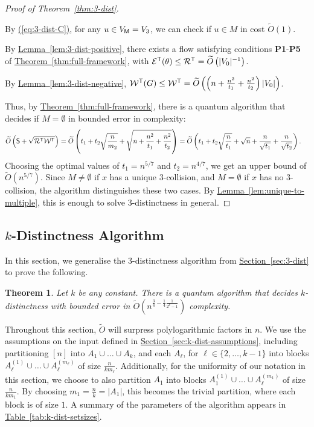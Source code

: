 \documentclass{article}
\newtheorem{theorem}{Theorem}\newtheorem{lemma}[theorem]{Lemma}\newtheorem{proposition}[theorem]{Proposition}\newtheorem{corollary}[theorem]{Corollary}\newtheorem{definition}[theorem]{Definition}\newtheorem{claim}[theorem]{Claim}\newtheorem{remark}[theorem]{Remark}\newenvironment{cfigure}[1][htbp]{\begin{figure}[#1]\centering}{\end{figure}}
\newcommand{\eq}[1]{\hyperref[eq:#1]{(\ref*{eq:#1})}}
\renewcommand{\sec}[1]{\hyperref[sec:#1]{Section~\ref*{sec:#1}}}
\newcommand{\thm}[1]{\hyperref[thm:#1]{Theorem~\ref*{thm:#1}}}
\newcommand{\lem}[1]{\hyperref[lem:#1]{Lemma~\ref*{lem:#1}}}
\newcommand{\tabl}[1]{\hyperref[tab:#1]{Table~\ref*{tab:#1}}}
\renewcommand{\>}{\rangle}
\newcommand{\<}{\langle}
\renewcommand{\(}{\left(}
\renewcommand{\)}{\right)}
\def\abs#1{\left| #1 \right|}
\begin{document}
\begin{proof}[Proof of Theorem~\ref{thm:3-dist}]
\begin{description}
\begin{description}
\end{description}

\item[Checking Subroutine:] By \eq{3-dist-C}, for any $u\in V_{\sf M}=V_3$, we can check if $u\in M$ in cost $\widetilde{O}(1)$. 
\item[Positive Condition:] By \lem{3-dist-positive}, there exists a flow satisfying conditions \textbf{P1}-\textbf{P5} of \thm{full-framework}, with ${\cal E}^{\sf T}(\theta)\leq {\cal R}^{\sf T}=\widetilde{O}\left(|V_0|^{-1} \right)$.
\item[Negative Condition:] By \lem{3-dist-negative}, ${\cal W}^{\sf T}(G)\leq {\cal W}^{\sf T}=\widetilde{O}\left(\left(n + \frac{n^2}{t_1} +\frac{n^2}{t_2}\right)|V_0|\right)$. 
\end{description}
Thus, by \thm{full-framework}, there is a quantum algorithm that decides if $M=\emptyset$ in bounded error in complexity:
\begin{align*}
\widetilde{O}\left({\sf S}+\sqrt{{\cal R}^{\sf T}{\cal W}^{\sf T}}\right) &= \widetilde{O}\left(t_1+t_2\sqrt{\frac{n}{m_2}}+\sqrt{n+\frac{n^2}{t_1}+\frac{n^2}{t_2}}\right)
=\widetilde{O}\left( t_1+t_2\sqrt{\frac{n}{t_1}}+\sqrt{n}+\frac{n}{\sqrt{t_1}}+\frac{n}{\sqrt{t_2}}\right).
\end{align*}
Choosing the optimal values of $t_1=n^{5/7}$ and $t_2=n^{4/7}$, we get an upper bound of $\widetilde{O}(n^{5/7})$.
Since $M\neq\emptyset$ if $x$ has a unique 3-collision, and $M=\emptyset$ if $x$ has no 3-collision, the algorithm distinguishes these two cases. By \lem{unique-to-multiple}, this is enough to solve 3-distinctness in general.
\end{proof}


\subsection{\texorpdfstring{$k$}{k}-Distinctness Algorithm}\label{sec:k-dist-alg}

In this section, we generalise the $3$-distinctness algorithm from \sec{3-dist} to prove the following.
\begin{theorem}\label{thm:k-dist}
	Let $k$ be any constant.
	There is a quantum algorithm that decides $k$-distinctness with bounded error in $\widetilde{O}\left(n^{\frac{3}{4}-\frac{1}{4}\frac{1}{2^k-1}}\right)$ complexity.
\end{theorem}
\noindent Throughout this section, $\widetilde{O}$ will surpress polylogarithmic factors in $n$.
We use the assumptions on the input defined in \sec{k-dist-assumptions}, including partitioning $[n]$ into $A_1\cup\dots\cup A_k$, and each $A_{\ell}$, for $\ell\in\{2,\dots, k-1\}$ into blocks $A_{\ell}^{(1)}\cup\dots\cup A_{\ell}^{(m_{\ell})}$ of size $\frac{n}{km_{\ell}}$. Additionally, for the uniformity of our notation in this section, we choose to also partition $A_1$ into blocks $A_{1}^{(1)}\cup\dots\cup A_{\ell}^{(m_{1})}$ of size $\frac{n}{km_{1}}$. By choosing $m_1 = \frac{n}{k} = \abs{A_1}$, this becomes the trivial partition, where each block is of size $1$. A summary of the parameters of the algorithm appears in \tabl{k-dist-setsizes}.
\end{document}
